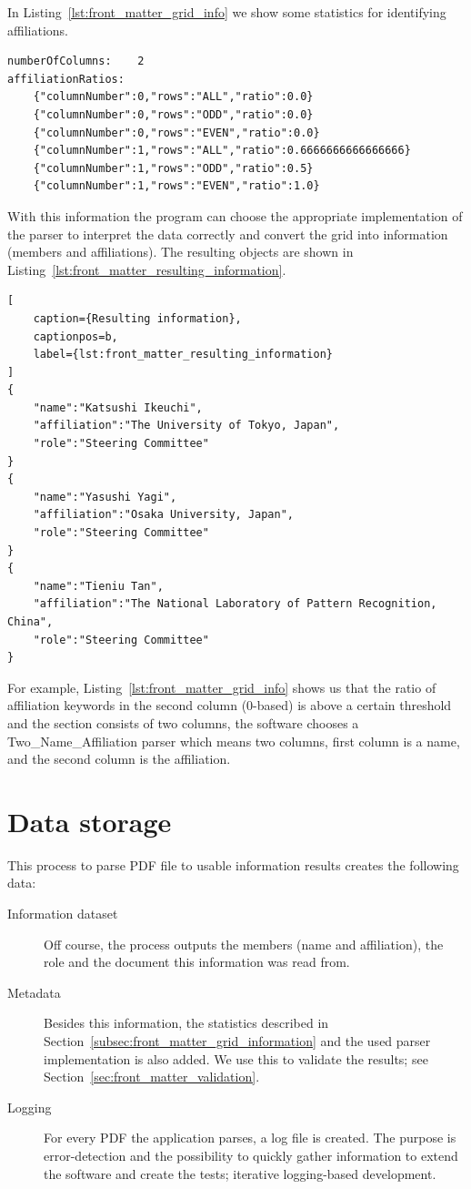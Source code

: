 \documentclass{ou-report}
\begin{document}
In Listing~\ref{lst:front_matter_grid_info} we show some statistics for 
identifying affiliations.

\begin{lstlisting}[caption={Some derived information from the grid},captionpos=b,label={lst:front_matter_grid_info}]
numberOfColumns:	2
affiliationRatios:
	{"columnNumber":0,"rows":"ALL","ratio":0.0}
	{"columnNumber":0,"rows":"ODD","ratio":0.0}
	{"columnNumber":0,"rows":"EVEN","ratio":0.0}
	{"columnNumber":1,"rows":"ALL","ratio":0.6666666666666666}
	{"columnNumber":1,"rows":"ODD","ratio":0.5}
	{"columnNumber":1,"rows":"EVEN","ratio":1.0}
\end{lstlisting}

With this information the program can choose the appropriate implementation
of the parser to
interpret the data correctly and convert the grid into information (members
and affiliations). The resulting objects are shown in
Listing~\ref{lst:front_matter_resulting_information}.
\begin{lstlisting}[
    caption={Resulting information},
    captionpos=b,
    label={lst:front_matter_resulting_information}
]
{
    "name":"Katsushi Ikeuchi",
    "affiliation":"The University of Tokyo, Japan",
    "role":"Steering Committee"
}
{
    "name":"Yasushi Yagi",
    "affiliation":"Osaka University, Japan",
    "role":"Steering Committee"
}
{
    "name":"Tieniu Tan",
    "affiliation":"The National Laboratory of Pattern Recognition, China",
    "role":"Steering Committee"
}
\end{lstlisting}
For example, Listing~\ref{lst:front_matter_grid_info} shows us that 
the ratio of affiliation keywords in the second column (0-based) is 
above a certain threshold and the section consists of two columns, the software 
chooses a Two\_Name\_Affiliation parser which means two columns, first column is a 
name, and the second column is the affiliation.

\section{Data storage}
This process to parse PDF file to usable information results creates the 
following data:
\begin{description}
    \item[Information dataset] Off course, the process outputs the members (name
        and affiliation), the role and the document this information was read 
        from.
    \item[Metadata] Besides this information, the statistics described in 
        Section~\ref{subsec:front_matter_grid_information} and the used parser 
        implementation is also added. We use this to validate the results; see 
        Section~\ref{sec:front_matter_validation}.
    \item[Logging] For every PDF the application parses, a log file is created.
        The purpose is error-detection and the possibility to quickly gather 
        information to extend the software and create the tests; iterative 
        logging-based development.
\end{description}
\end{document}
